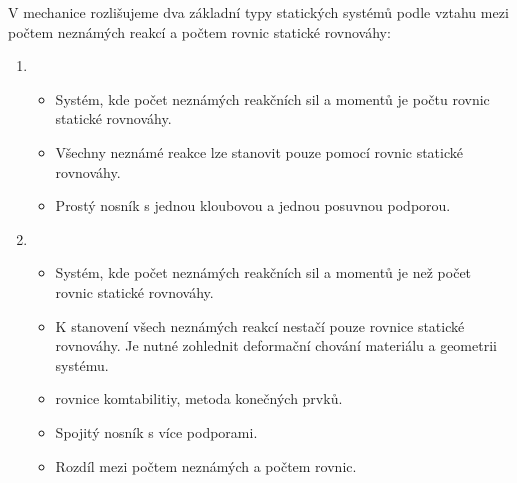 \documentclass[letterpaper,10pt,english]{jupyterBook}
\begin{document}
\sphinxAtStartPar
V mechanice rozlišujeme dva základní typy statických systémů podle vztahu mezi počtem neznámých reakcí a počtem rovnic statické rovnováhy:
\begin{enumerate}
%
\item {} 
\sphinxAtStartPar
{}
\begin{itemize}
\item {} 
\sphinxAtStartPar
{} Systém, kde počet neznámých reakčních sil a momentů je  počtu rovnic statické rovnováhy.

\item {} 
\sphinxAtStartPar
{} Všechny neznámé reakce lze stanovit pouze pomocí rovnic statické rovnováhy.

\item {} 
\sphinxAtStartPar
{} Prostý nosník s jednou kloubovou a jednou posuvnou podporou.

\end{itemize}

\item {} 
\sphinxAtStartPar
{}
\begin{itemize}
\item {} 
\sphinxAtStartPar
{} Systém, kde počet neznámých reakčních sil a momentů je  než počet rovnic statické rovnováhy.

\item {} 
\sphinxAtStartPar
{} K stanovení všech neznámých reakcí nestačí pouze rovnice statické rovnováhy. Je nutné zohlednit deformační chování materiálu a geometrii systému.

\item {} 
\sphinxAtStartPar
{} rovnice komtabilitiy, metoda konečných prvků.

\item {} 
\sphinxAtStartPar
{} Spojitý nosník s více podporami.

\item {} 
\sphinxAtStartPar
{} Rozdíl mezi počtem neznámých a počtem rovnic.

\end{itemize}

\end{enumerate}
\end{document}
